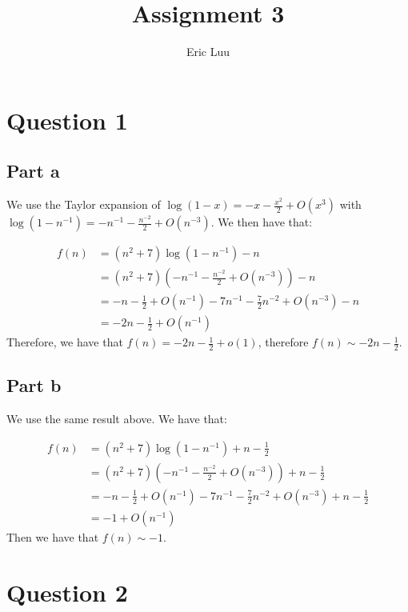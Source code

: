 \documentclass[]{article}
\title{Assignment 3}
\author{Eric Luu}
\begin{document}
\maketitle
\section{Question 1}
\subsection{Part a}
We use the Taylor expansion of $\log(1 - x) = -x - \frac{x^2}{2} + O(x^3)$ with $\log(1 - n^{-1}) = -n^{-1} - \frac{n^{-2}}{2}+ O(n^{-3})$. We then have that:

\begin{align*}
	f(n) &= (n^2 + 7)\log(1 - n^{-1}) - n\\
	&= (n^2 + 7)\left(-n^{-1} - \frac{n^{-2}}{2} + O(n^{-3})\right) - n\\
	&= -n -\frac{1}{2} + O(n^{-1})- 7n^{-1} - \frac{7}{2}n^{-2} + O(n^{-3}) - n\\
	&= -2n -\frac{1}{2} + O(n^{-1})
\end{align*}
Therefore, we have that $f(n) = -2n -\frac{1}{2} + o(1)$, therefore $f(n) \sim -2n -\frac{1}{2}$. 
\subsection{Part b}
We use the same result above. We have that:

\begin{align*}
	f(n) &= (n^2 + 7)\log(1 - n^{-1}) + n - \frac{1}{2}\\
	&= (n^2 + 7)\left(-n^{-1} - \frac{n^{-2}}{2} + O(n^{-3})\right) + n - \frac{1}{2}\\
	&= -n -\frac{1}{2} + O(n^{-1})- 7n^{-1} - \frac{7}{2}n^{-2} + O(n^{-3}) + n - \frac{1}{2}\\
	&= -1 + O(n^{-1})
\end{align*}
Then we have that $f(n) \sim -1$. 

\section{Question 2}
\end{document}
